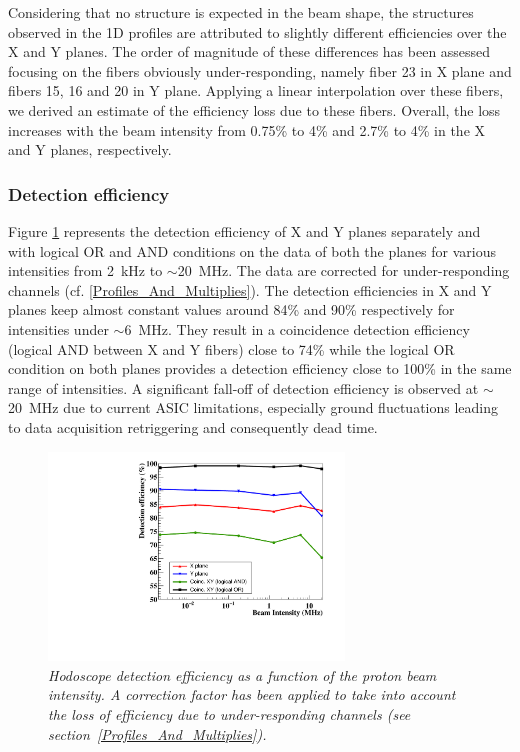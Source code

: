 \documentclass[a4paper,11pt]{article}
\begin{document}
Considering that no structure is expected in the beam shape, the structures observed in the 1D profiles are attributed to slightly different efficiencies over the X and Y planes. The order of magnitude of these differences has been assessed focusing on the fibers obviously under-responding, namely fiber 23 in X plane and fibers 15, 16 and 20 in Y plane. Applying a linear interpolation over these fibers, we derived an estimate of the efficiency loss due to these fibers. Overall, the loss increases with the beam intensity from 0.75\% to 4\% and 2.7\% to 4\% in the X and Y planes, respectively.  

\subsubsection{Detection efficiency}

Figure \ref{fig:DE} represents the detection efficiency of X and Y planes separately and with logical OR and AND conditions on the data of both the planes for various intensities from 2~kHz to $\sim$20~MHz. The data are corrected for under-responding channels (cf. \ref{Profiles_And_Multiplies}). The detection efficiencies in X and Y planes keep almost constant values around 84\% and 90\% respectively for intensities under $\sim$6~MHz. They result in a coincidence detection efficiency (logical AND between X and Y fibers) close to 74\% while the logical OR condition on both planes provides a detection efficiency close to 100\% in the same range of intensities. A significant fall-off of detection efficiency is observed at $\sim$20~MHz due to current ASIC limitations, especially ground fluctuations leading to data acquisition retriggering and consequently dead time.   

\begin{figure}[htb]
\centering
\includegraphics[width=0.7\textwidth]{figures/DE_March_2019_corr.pdf}
\caption{\small{\textit{Hodoscope  detection  efficiency  as  a  function  of the proton beam intensity. A correction factor has been applied to take into account the loss of efficiency due to under-responding channels (see section~\ref{Profiles_And_Multiplies}).}}}
\label{fig:DE}
\end{figure}
\end{document}
